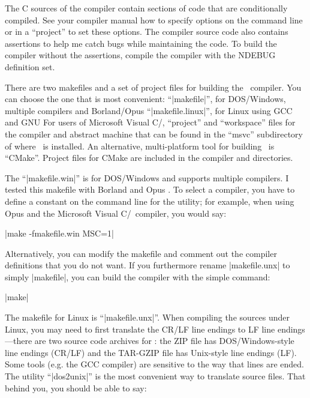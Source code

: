 \def\boldline#1{{\bf #1}\lbreak}

The C sources of the compiler contain sections of code that are conditionally
compiled. See your compiler manual how to specify options on the command line
or in a ``project'' to set these options. The compiler source code also
contains assertions to help me catch bugs while maintaining the code. To build
the compiler without the assertions, compile the compiler with the NDEBUG
definition set.

There are two makefiles and a set of project files for building the \Small\ compiler.
You can choose the one that is most convenient:
\beginlist{1em}\compactlist
\list{\lbullet}
   
  ``|makefile|'', for DOS/Windows, multiple compilers and Borland/Opus 
\list{\lbullet}
   
  ``|makefile.linux|'', for Linux using GCC and GNU 
\list{\lbullet}
  For users of Microsoft Visual C/\Cpp, ``project'' and ``workspace''
  files for the compiler and abstract machine that can be found in the ``msvc''
  subdirectory of where \Small\ is installed.
\list{\lbullet}
  An alternative, multi-platform tool for building \Small\ is ``CMake''.
  Project files for CMake are included in the compiler and 
  directories.
\endlist

  
The ``|makefile.win|'' is for DOS/Windows and supports multiple compilers. I tested
this makefile with Borland  and Opus . To select
a compiler, you have to define a constant on the command line for the 
utility; for example, when using Opus  and the Microsoft
Visual C/\Cpp\ compiler, you would say:

\tabto 40pt |make -fmakefile.win MSC=1|

Alternatively, you can modify the makefile and comment out the compiler
definitions that you do not want. If you furthermore rename |makefile.unx| to
simply |makefile|, you can build the compiler with the simple command:

\tabto 40pt |make|

  
The makefile for Linux is ``|makefile.unx|''. When compiling the sources under
Linux, you may need to first translate the CR/LF line endings to LF line endings
---there are two source code archives for \Small: the ZIP file has DOS/Windows-style
line endings (CR/LF) and the TAR-GZIP file has Unix-style line endings (LF).
Some tools (e.g. the GCC compiler) are sensitive to the way that lines are
ended. The utility ``|dos2unix|'' is the most convenient way to translate source
files. That behind you, you should be able to say:

